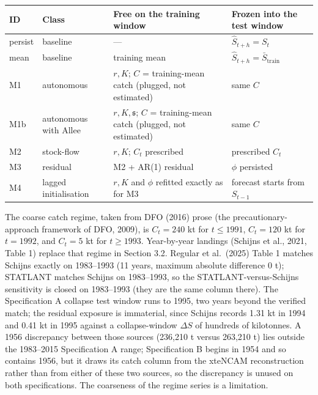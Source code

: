 \documentclass[11pt]{article}
\begin{document}
\begin{longtable}[]{@{}
  >{\raggedright\arraybackslash}p{}
  >{\raggedright\arraybackslash}p{}
  >{\raggedright\arraybackslash}p{}
  >{\raggedright\arraybackslash}p{}@{}}
\toprule\noalign{}
ID & Class & Free on the training window & Frozen into the test window \\
\midrule\noalign{}
\endhead
\bottomrule\noalign{}
\endlastfoot
persist & baseline & --- & \(\hat S_{t+h}=S_t\) \\
mean & baseline & training mean &
\(\hat S_{t+h}=\bar S_{\mathrm{train}}\) \\
M1 & autonomous & \(r,K\); \(C\) = training-mean catch (plugged, not
estimated) & same \(C\) \\
M1b & autonomous with Allee & \(r,K,\mathfrak s\); \(C\) =
training-mean catch (plugged, not estimated) & same \(C\) \\
M2 & stock-flow & \(r,K\); \(C_t\) prescribed & prescribed \(C_t\) \\
M3 & residual & M2 + AR(1) residual & \(\phi\) persisted \\
M4 & lagged initialisation & \(r,K\) and \(\phi\) refitted exactly as for M3 & forecast
starts from \(S_{t-1}\) \\
\end{longtable}

The coarse catch regime, taken from DFO (2016) prose (the
precautionary-approach framework of DFO, 2009), is \(C_t=240\) kt for
\(t\le 1991\), \(C_t=120\) kt for \(t=1992\), and \(C_t=5\) kt for
\(t\ge 1993\). Year-by-year landings (Schijns et al., 2021, Table 1)
replace that regime in Section 3.2. Regular et al.~(2025) Table 1
matches Schijns exactly on 1983--1993 (11 years, maximum absolute
difference 0 t); STATLANT matches Schijns on 1983--1993, so the
STATLANT-versus-Schijns sensitivity is closed on 1983--1993 (they are
the same column there). The Specification A collapse test window runs to
1995, two years beyond the verified match; the residual exposure is
immaterial, since Schijns records 1.31 kt in 1994 and 0.41 kt in 1995
against a collapse-window \(\Delta S\) of hundreds of kilotonnes. A
1956 discrepancy between those sources (236,210 t versus 263,210 t) lies
outside the 1983--2015 Specification A range; Specification B begins in
1954 and so contains 1956, but it draws its catch column from the
xteNCAM reconstruction rather than from either of these two sources, so
the discrepancy is unused on both specifications. The coarseness of the regime series is a limitation.
\end{document}
